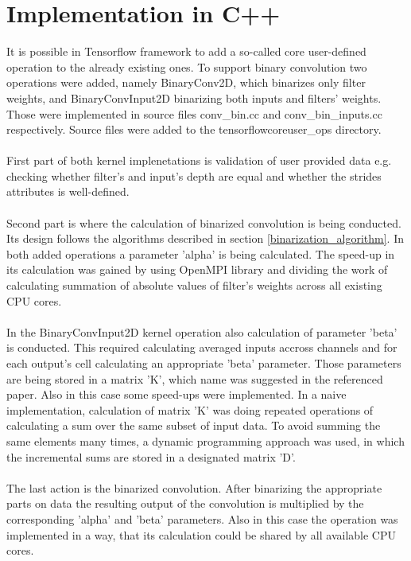 \documentclass[licencjacka]{pracamgr}
\begin{document}
		\section{Implementation in C++}
		It is possible in Tensorflow framework to add a so-called core user-defined operation to the already existing ones. To support binary convolution two operations were added, namely BinaryConv2D, which binarizes only filter weights, and BinaryConvInput2D binarizing both inputs and filters' weights. Those were implemented in source files conv\_bin.cc and conv\_bin\_inputs.cc respectively. Source files were added to the \/tensorflow\/core\/user\_ops directory.
\\\\
		First part of both kernel implenetations is validation of user provided data e.g. checking whether filter's and input's depth are equal and whether the strides attributes is well-defined.
\\\\
		Second part is where the calculation of binarized convolution is being conducted. Its design follows the algorithms described in section \ref{binarization_algorithm}. In both added operations a parameter 'alpha' is being calculated. The speed-up in its calculation was gained by using OpenMPI library and dividing the work of calculating summation of absolute values of filter's weights across all existing CPU cores.
\\\\
		In the BinaryConvInput2D kernel operation also calculation of parameter 'beta' is conducted. This required calculating averaged inputs accross channels and for each output's cell calculating an appropriate 'beta' parameter. Those parameters are being stored in a matrix 'K', which name was suggested in the referenced paper. Also in this case some speed-ups were implemented. In a naive implementation, calculation of matrix 'K' was doing repeated operations of calculating a sum over the same subset of input data. To avoid summing the same elements many times, a dynamic programming approach was used, in which the incremental sums are stored in a designated matrix 'D'.
\\\\	
		The last action is the binarized convolution. After binarizing the appropriate parts on data the resulting output of the convolution is multiplied by the corresponding 'alpha' and 'beta' parameters. Also in this case the operation was implemented in a way, that its calculation could be shared by all available CPU cores.
\end{document}
